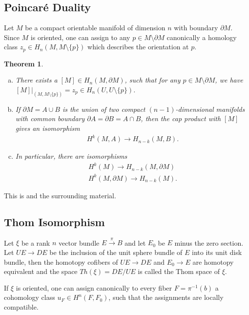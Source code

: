 \documentclass{scrartcl}
\let\emph\relax
\theoremstyle{plain}
\newtheorem{theorem}{Theorem}[section]
\theoremstyle{definition}
\newcommand{\union}{\mathbin{\cup}}
\newcommand{\isect}{\mathbin{\cap}}
\begin{document}
\subsection{Poincaré Duality}
Let $M$ be a compact orientable manifold of dimension $n$ with boundary $\partial M$. Since $M$ is oriented, one can assign to any $p\in M\setminus \partial M$ canonically a homology class $z_p\in H_n(M, M\setminus \{p\})$ which describes the orientation at $p$.
\begin{theorem} \label{thm:poincare_duality}
\begin{enumerate}[(a)]
    \item There exists a \emph{fundamental class} $[M]\in H_n(M,\partial M)$, such that for any $p\in M\setminus \partial M$, we have $[M]|_{(M, M\setminus\{p\})} = z_p\in H_n(U, U\setminus \{p\})$.
    \item If $\partial M = A \union B$ is the union of two compact $(n-1)$-dimensional manifolds with common boundary $\partial A = \partial B = A\isect B$, then the cap product with $[M]$ gives an isomorphism
    \begin{align*}
        H^k(M, A) \to H_{n-k}(M, B).
    \end{align*}
    \item In particular, there are isomorphisms
    \begin{align*}
        H^k(M) \to H_{n-k}(M, \partial M) \\
        H^k(M,\partial M) \to H_{n-k}(M).
    \end{align*}
\end{enumerate}
\end{theorem}

This is \cite[Thm 3.43]{hatcher2002algebraic} and the surrounding material.

\subsection{Thom Isomorphism}
Let $\xi$ be a rank $n$ vector bundle $E\xrightarrow{\pi} B$ and let $E_0$ be $E$ minus the zero section. Let $UE\to DE$ be the inclusion of the unit sphere bundle of $E$ into its unit disk bundle, then the homotopy cofibers of $UE\to DE$ and $E_0\to E$ are homotopy equivalent and the space $Th(\xi) = DE / UE$ is called the Thom space of $\xi$. 

If $\xi$ is oriented, one can assign canonically to every fiber $F=\pi^{-1}(b)$ a cohomology class $u_F\in H^n(F, F_0)$, such that the assignments are locally compatible.
\end{document}
